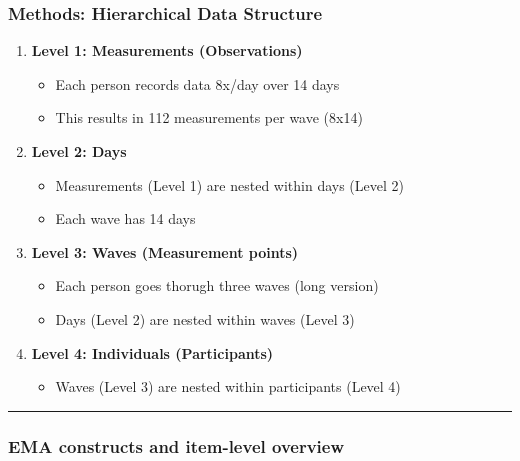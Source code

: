 \documentclass[
  letterpaper,
  DIV=11,
  numbers=noendperiod]{scrartcl}
\providecommand{\tightlist}{%
  \setlength{\itemsep}{0pt}\setlength{\parskip}{0pt}}
\begin{document}
\subsubsection{Methods: Hierarchical Data
Structure}\label{methods-hierarchical-data-structure}

\begin{enumerate}
\def\labelenumi{\arabic{enumi}.}
\tightlist
\item
  \textbf{Level 1: Measurements (Observations)}

  \begin{itemize}
  \tightlist
  \item
    Each person records data 8x/day over 14 days
  \item
    This results in 112 measurements per wave (8x14)
  \end{itemize}
\item
  \textbf{Level 2: Days}

  \begin{itemize}
  \tightlist
  \item
    Measurements (Level 1) are nested within days (Level 2)
  \item
    Each wave has 14 days
  \end{itemize}
\item
  \textbf{Level 3: Waves (Measurement points)}

  \begin{itemize}
  \tightlist
  \item
    Each person goes thorugh three waves (long version)
  \item
    Days (Level 2) are nested within waves (Level 3)
  \end{itemize}
\item
  \textbf{Level 4: Individuals (Participants)}

  \begin{itemize}
  \tightlist
  \item
    Waves (Level 3) are nested within participants (Level 4)
  \end{itemize}
\end{enumerate}

\begin{center}\rule{0.5\linewidth}{0.5pt}\end{center}

\subsubsection{EMA constructs and item-level
overview}\label{emaconstructs}
\end{document}
